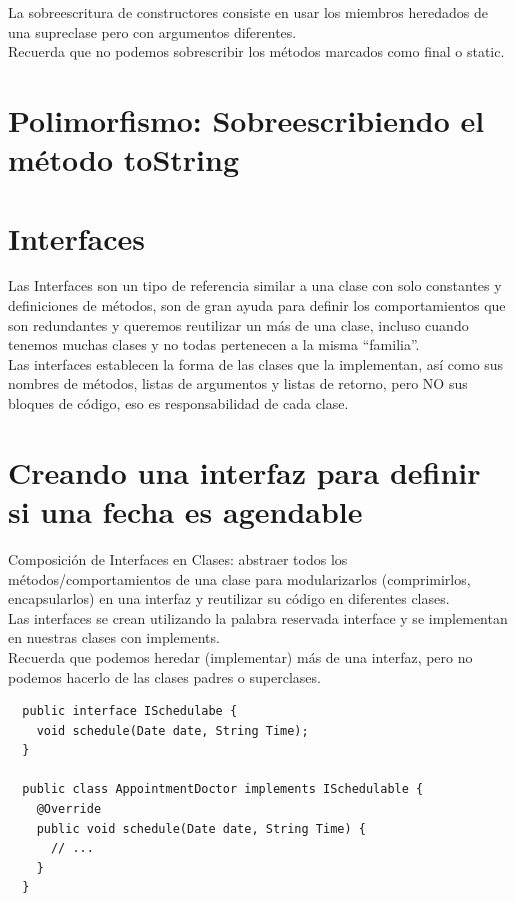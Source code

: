 \documentclass{article}
\begin{document}
La sobreescritura de constructores consiste en usar los miembros heredados de
una supreclase pero con argumentos diferentes.\\

Recuerda que no podemos sobrescribir los métodos marcados como final o
static.\\


\section{Polimorfismo: Sobreescribiendo el método toString}%


\section{Interfaces}%
Las Interfaces son un tipo de referencia similar a una clase con solo
constantes y definiciones de métodos, son de gran ayuda para definir los
comportamientos que son redundantes y queremos reutilizar un más de una clase,
incluso cuando tenemos muchas clases y no todas pertenecen a la misma
“familia”.\\

Las interfaces establecen la forma de las clases que la implementan, así como
sus nombres de métodos, listas de argumentos y listas de retorno, pero NO sus
bloques de código, eso es responsabilidad de cada clase.\\


\section{Creando una interfaz para definir si una fecha es agendable}%
Composición de Interfaces en Clases: abstraer todos los métodos/comportamientos
de una clase para modularizarlos (comprimirlos, encapsularlos) en una interfaz
y reutilizar su código en diferentes clases.\\

Las interfaces se crean utilizando la palabra reservada interface y se
implementan en nuestras clases con implements.\\

Recuerda que podemos heredar (implementar) más de una interfaz, pero no podemos
hacerlo de las clases padres o superclases.\\

\begin{verbatim}
  public interface ISchedulabe {
    void schedule(Date date, String Time);
  }

  public class AppointmentDoctor implements ISchedulable {
    @Override
    public void schedule(Date date, String Time) {
      // ...
    }
  }
\end{verbatim}
\end{document}
